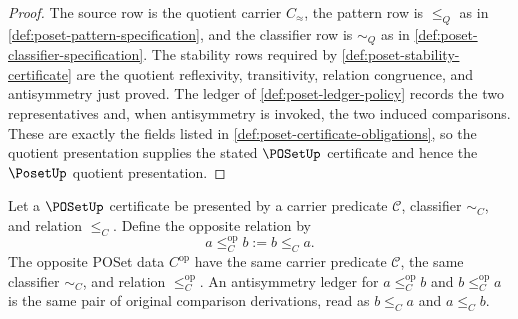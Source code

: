 \begin{proof}
The source row is the quotient carrier $C_{\!\approx}$, the pattern row is $\le_Q$ as in \autoref{def:poset-pattern-specification}, and the classifier row is $\sim_Q$ as in \autoref{def:poset-classifier-specification}. The stability rows required by \autoref{def:poset-stability-certificate} are the quotient reflexivity, transitivity, relation congruence, and antisymmetry just proved. The ledger of \autoref{def:poset-ledger-policy} records the two representatives and, when antisymmetry is invoked, the two induced comparisons. These are exactly the fields listed in \autoref{def:poset-certificate-obligations}, so the quotient presentation supplies the stated $\POSetUp$ certificate and hence the $\PosetUp$ quotient presentation.
\end{proof}

\begin{definition}
\label{def:opposite-poset-certificate-data}
Let a $\POSetUp$ certificate be presented by a carrier predicate $\mathcal C$, classifier $\sim_C$, and relation $\le_C$. Define the opposite relation by
$$
a\le_C^{\mathrm{op}} b:=b\le_C a.
$$
The opposite POSet data $C^{\mathrm{op}}$ have the same carrier predicate $\mathcal C$, the same classifier $\sim_C$, and relation $\le_C^{\mathrm{op}}$. An antisymmetry ledger for $a\le_C^{\mathrm{op}} b$ and $b\le_C^{\mathrm{op}} a$ is the same pair of original comparison derivations, read as $b\le_C a$ and $a\le_C b$.
\end{definition}

